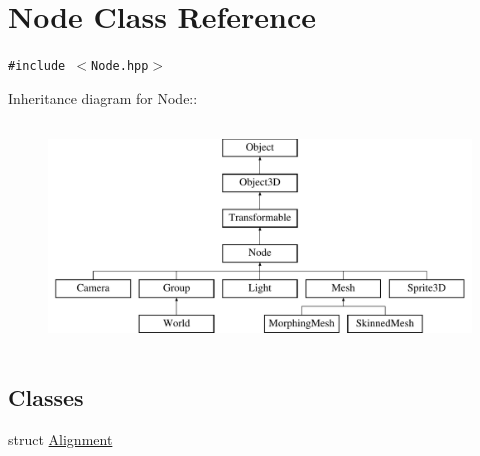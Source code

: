 \hypertarget{classm3g_1_1Node}{
\section{Node Class Reference}
\label{classm3g_1_1Node}
}
{\tt \#include $<$Node.hpp$>$}

Inheritance diagram for Node::\begin{figure}[H]
\begin{center}
\leavevmode
\includegraphics[height=6cm]{classm3g_1_1Node}
\end{center}
\end{figure}
\subsection*{Classes}
\begin{CompactItemize}
\item 
struct \hyperlink{structm3g_1_1Node_1_1Alignment}{Alignment}
\end{CompactItemize}
